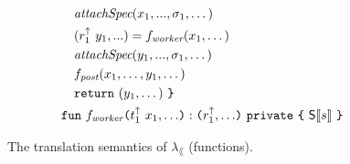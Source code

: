 \begin{figure}
\begin{alignat*}{2}
        &   \hspace{2.25em} \Attach{x_1, ..., \sigma_1, \dots} && \\
        &   \hspace{2.25em} (r_1^\uparrow ~ y_1, ...) = f_\textit{worker}(x_1, \dots) && \\
        &   \hspace{2.25em} \Attach{y_1, ..., \sigma_1, \dots} && \\
        &   \hspace{2.25em} f_\textit{post}(x_1, \dots, y_1, \dots) && \\
        &   \hspace{2.25em} \Keywd{return}~ (y_1, \dots) ~ \Keywd{\}} && \\
        & \hspace{1.25em}
          \FunType{f_{\textit{worker}}}{t_1^\uparrow ~ x_1, \dots}{\Keywd{private}}{r_1^\uparrow, \dots} ~ \Keywd{\{} ~ \Sdenot{s} ~ \Keywd{\}}  &&
  \end{alignat*}
  \vspace{-2mm}
  \caption{The translation semantics of $\lambda_\lang$ (functions).}
  \label{fig:fun-translation}
\end{figure}
